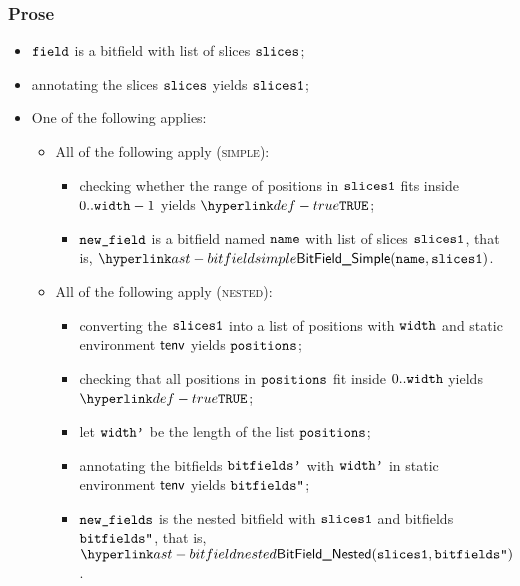 \subsubsection{Prose}
\begin{itemize}
  \item $\texttt{field}$ is a bitfield with list of slices $\texttt{slices}$;
  \item annotating the slices $\texttt{slices}$ yields $\texttt{slices1}$\ProseOrTypeError;
  \item One of the following applies:
  \begin{itemize}
    \item All of the following apply (\textsc{simple}):
    \begin{itemize}
      \item checking whether the range of positions in $\texttt{slices1}$ fits inside $0..\texttt{width}-1$ yields $\True$\ProseOrTypeError;
      \item $\texttt{new\_field}$ is a bitfield named $\texttt{name}$ with list of slices $\texttt{slices1}$, that is, $\BitFieldSimple(\name, \slicesone)$.
    \end{itemize}

    \item All of the following apply (\textsc{nested}):
    \begin{itemize}
      \item converting the $\texttt{slices1}$ into a list of positions with $\texttt{width}$ and static environment $\textsf{tenv}$
      yields $\texttt{positions}$\ProseOrTypeError;
      \item checking that all positions in $\texttt{positions}$ fit inside $0..\texttt{width}$ yields \\
            $\True$\ProseOrTypeError;
      \item let $\texttt{width'}$ be the length of the list $\texttt{positions}$;
      \item annotating the bitfields $\texttt{bitfields'}$ with $\texttt{width'}$ in static environment $\textsf{tenv}$ yields $\texttt{bitfields''}$\ProseOrTypeError;
      \item $\texttt{new\_fields}$ is the nested bitfield with $\texttt{slices1}$ and bitfields $\texttt{bitfields''}$, that is, $\BitFieldNested(\slicesone, \bitfieldspp)$.
    \end{itemize}


\end{itemize}
\end{itemize}
